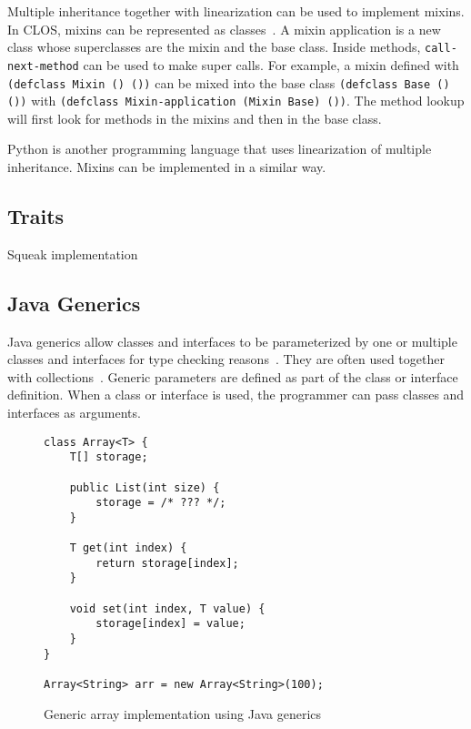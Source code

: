 Multiple inheritance together with linearization can be used to implement mixins. In CLOS, mixins can be represented as classes~\cite{Smaragdakis:1998:ILD:646155.679703}. A mixin application is a new class whose superclasses are the mixin and the base class. Inside methods, \texttt{call-next-method} can be used to make super calls. For example, a mixin defined with \texttt{(defclass Mixin () ())} can be mixed into the base class \texttt{(defclass Base () ())} with \texttt{(defclass Mixin-application (Mixin Base) ())}. The method lookup will first look for methods in the mixins and then in the base class.

Python is another programming language that uses linearization of multiple inheritance. Mixins can be implemented in a similar way.


\subsection{Traits}
\label{sec:rel_traits}
Squeak implementation

\subsection{Java Generics}
Java generics allow classes and interfaces to be parameterized by one or multiple classes and interfaces for type checking reasons~\cite{bracha2004generics, Bracha03addinggenerics}. They are often used together with collections~\cite{Parnin:2011:JGA:1985441.1985446}. Generic parameters are defined as part of the class or interface definition. When a class or interface is used, the programmer can pass classes and interfaces as arguments.

\begin{figure}[!htp]
\begin{lstlisting}
class Array<T> {
    T[] storage;

    public List(int size) {
        storage = /* ??? */;
    }

    T get(int index) {
        return storage[index];
    }

    void set(int index, T value) {
        storage[index] = value;
    }
}

Array<String> arr = new Array<String>(100);
\end{lstlisting}
\caption{Generic array implementation using Java generics}
\label{fig:rel_java_generics}
\end{figure}

